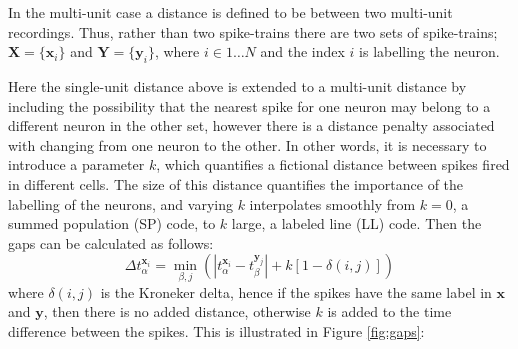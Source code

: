 \documentclass[11pt]{amsart}
\begin{document}
In the multi-unit case a distance is defined to be between two multi-unit recordings.  Thus, rather than two spike-trains there are two sets of spike-trains; $\mathbf{X}=\{ \mathbf{x}_i \}$ and $ \mathbf{Y}=\{ \mathbf{y}_i \}$, where $i \in 1\ldots N$ and the index $i$ is labelling the neuron.

Here the single-unit distance above is extended to a multi-unit distance by including the possibility that the nearest spike for one neuron may belong to a different neuron in the other set, however there is a distance penalty associated with changing from one neuron to the other. In other words, it is necessary to introduce a parameter $k$, which quantifies a fictional distance between spikes fired in different cells.  The size of this distance quantifies the importance of the labelling of the neurons, and varying $k$ interpolates smoothly from $k=0$, a summed population (SP) code, to $k$ large, a labeled line  (LL) code.  Then the gaps can be calculated as follows:
\begin{equation}
\Delta t_{\alpha}^{\mathbf{x}_i} = \min_{\beta,j} \left( |t_{\alpha}^{\mathbf{x}_i} - t_{\beta}^{\mathbf{y}_j} | + k\left[1-\delta(i,j)\right] \right)
\end{equation}
where $\delta(i,j)$ is the Kroneker delta, hence if the spikes have the same label in $\mathbf{x}$ and $\mathbf{y}$, then there is no added distance, otherwise $k$ is added to the time difference between the spikes.  This is illustrated in Figure \ref{fig:gaps}:
\end{document}
